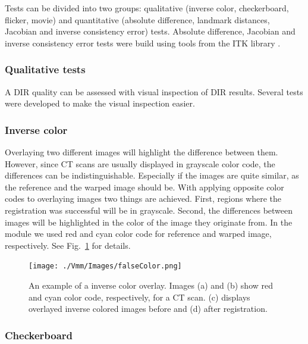 Tests can be divided into two groups: qualitative (inverse color, checkerboard, flicker, movie) and quantitative 
(absolute difference, landmark distances, Jacobian and inverse consistency error) tests.
Absolute difference, Jacobian and inverse consistency error tests
were build using tools from the ITK library \cite{Yoo2002}.

\subsubsection{Qualitative tests}

A DIR quality can be assessed with visual inspection of DIR results. Several tests were developed to make the visual inspection easier.


\subsubsection{Inverse color}


Overlaying two different images will highlight the difference between them. However, since CT scans are usually displayed in grayscale color code, the differences can be indistinguishable. 
Especially if the images are quite similar, as the reference and the warped image should be. With applying opposite color codes to overlaying images two things are achieved. 
First, regions where the registration was successful will be in grayscale. Second, the differences between images will be highlighted in the color of the image they originate from. 
In the module we used red and cyan color code for reference and warped image, respectively. See Fig.~\ref{falseColor} for details.

\begin{figure}[H]
	\begin{center}		
		\texttt{[image: ./Vmm/Images/falseColor.png]}
		\caption{An example of a inverse color overlay. Images (a) and (b) show red and cyan color code, respectively, for a CT scan. (c) displays overlayed inverse colored images before and (d) after registration.}
		\label{falseColor}
	\end{center}
\end{figure}

\subsubsection{Checkerboard}


